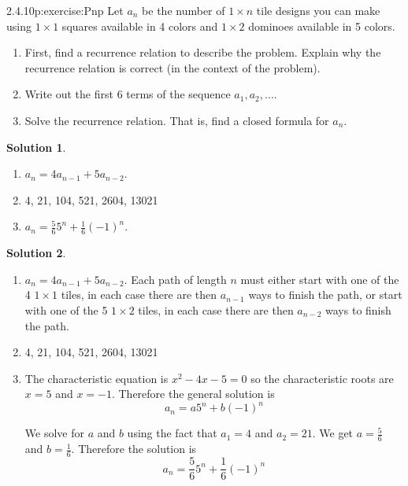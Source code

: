 \documentclass[twoside,11pt,]{book}
\newcommand{\blocktitlefont}{\relax}
\numberwithin{equation}{chapter}
\begin{document}
\begin{divisionsolution}{2.4.10}{}{p:exercise:Pnp}%
Let \(a_n\) be the number of \(1 \times n\) tile designs you can make using \(1 \times 1\) squares available in 4 colors and \(1 \times 2\) dominoes available in 5 colors.%
\begin{enumerate}[label=(\alph*)]
\item{}First, find a recurrence relation to describe the problem. Explain why the recurrence relation is correct (in the context of the problem).%
\item{}Write out the first 6 terms of the sequence \(a_1, a_2, \ldots\).%
\item{}Solve the recurrence relation. That is, find a closed formula for \(a_n\).%
\end{enumerate}
%
\par\smallskip%
\noindent\textbf{\blocktitlefont Solution 1}.\quad{}%
\begin{enumerate}[label=(\alph*)]
\item{}\(a_n = 4a_{n-1} + 5a_{n-2}\).%
\item{}4, 21, 104, 521, 2604, 13021%
\item{}\(a_n = \frac{5}{6} 5^n + \frac{1}{6}(-1)^n\).%
\end{enumerate}
%
\par\smallskip%
\noindent\textbf{\blocktitlefont Solution 2}.\quad{}%
\begin{enumerate}[label=(\alph*)]
\item{}\(a_n = 4a_{n-1} + 5a_{n-2}\). Each path of length \(n\) must either start with one of the 4 \(1\times 1\) tiles, in each case there are then \(a_{n-1}\) ways to finish the path, or start with one of the 5 \(1\times 2\) tiles, in each case there are then \(a_{n-2}\) ways to finish the path.%
\item{}4, 21, 104, 521, 2604, 13021%
\item{}The characteristic equation is \(x^2 - 4x - 5 = 0\) so the characteristic roots are \(x = 5\) and \(x = -1\). Therefore the general solution is%
\begin{equation*}
a_n = a 5^n + b (-1)^n
\end{equation*}
%
\par
We solve for \(a\) and \(b\) using the fact that \(a_1 = 4\) and \(a_2 = 21\). We get \(a = \frac{5}{6}\) and \(b = \frac{1}{6}\). Therefore the solution is%
\begin{equation*}
a_n = \frac{5}{6} 5^n + \frac{1}{6}(-1)^n
\end{equation*}
%
\end{enumerate}
%
\end{divisionsolution}%
\end{document}
